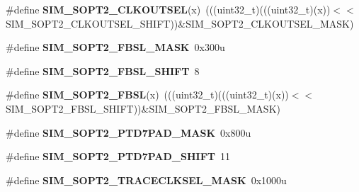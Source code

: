 \begin{DoxyCompactItemize}
\item 
\#define {\bfseries S\+I\+M\+\_\+\+S\+O\+P\+T2\+\_\+\+C\+L\+K\+O\+U\+T\+S\+EL}(x)~(((uint32\+\_\+t)(((uint32\+\_\+t)(x))$<$$<$S\+I\+M\+\_\+\+S\+O\+P\+T2\+\_\+\+C\+L\+K\+O\+U\+T\+S\+E\+L\+\_\+\+S\+H\+I\+FT))\&S\+I\+M\+\_\+\+S\+O\+P\+T2\+\_\+\+C\+L\+K\+O\+U\+T\+S\+E\+L\+\_\+\+M\+A\+SK)\hypertarget{group__SIM__Register__Masks_ga34712f0ffce6dca092bd902ef7eb783f}{}\label{group__SIM__Register__Masks_ga34712f0ffce6dca092bd902ef7eb783f}

\item 
\#define {\bfseries S\+I\+M\+\_\+\+S\+O\+P\+T2\+\_\+\+F\+B\+S\+L\+\_\+\+M\+A\+SK}~0x300u\hypertarget{group__SIM__Register__Masks_ga27b0cb220aaf94e8d04795bd682ebd78}{}\label{group__SIM__Register__Masks_ga27b0cb220aaf94e8d04795bd682ebd78}

\item 
\#define {\bfseries S\+I\+M\+\_\+\+S\+O\+P\+T2\+\_\+\+F\+B\+S\+L\+\_\+\+S\+H\+I\+FT}~8\hypertarget{group__SIM__Register__Masks_ga7077057e2a7f0841d8151d2703d85f16}{}\label{group__SIM__Register__Masks_ga7077057e2a7f0841d8151d2703d85f16}

\item 
\#define {\bfseries S\+I\+M\+\_\+\+S\+O\+P\+T2\+\_\+\+F\+B\+SL}(x)~(((uint32\+\_\+t)(((uint32\+\_\+t)(x))$<$$<$S\+I\+M\+\_\+\+S\+O\+P\+T2\+\_\+\+F\+B\+S\+L\+\_\+\+S\+H\+I\+FT))\&S\+I\+M\+\_\+\+S\+O\+P\+T2\+\_\+\+F\+B\+S\+L\+\_\+\+M\+A\+SK)\hypertarget{group__SIM__Register__Masks_ga0ac5747a6f12a63218b75398d10d4af1}{}\label{group__SIM__Register__Masks_ga0ac5747a6f12a63218b75398d10d4af1}

\item 
\#define {\bfseries S\+I\+M\+\_\+\+S\+O\+P\+T2\+\_\+\+P\+T\+D7\+P\+A\+D\+\_\+\+M\+A\+SK}~0x800u\hypertarget{group__SIM__Register__Masks_gaf295c85205620f0ece4cf7a888fc298f}{}\label{group__SIM__Register__Masks_gaf295c85205620f0ece4cf7a888fc298f}

\item 
\#define {\bfseries S\+I\+M\+\_\+\+S\+O\+P\+T2\+\_\+\+P\+T\+D7\+P\+A\+D\+\_\+\+S\+H\+I\+FT}~11\hypertarget{group__SIM__Register__Masks_ga82543a91a19387f58f922371b4b5cc95}{}\label{group__SIM__Register__Masks_ga82543a91a19387f58f922371b4b5cc95}

\item 
\#define {\bfseries S\+I\+M\+\_\+\+S\+O\+P\+T2\+\_\+\+T\+R\+A\+C\+E\+C\+L\+K\+S\+E\+L\+\_\+\+M\+A\+SK}~0x1000u\hypertarget{group__SIM__Register__Masks_ga332894211abcda547cbf5d5093bd3f72}{}\label{group__SIM__Register__Masks_ga332894211abcda547cbf5d5093bd3f72}


\end{DoxyCompactItemize}
